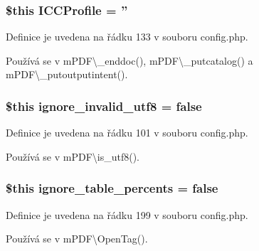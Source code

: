 \hypertarget{config_8php_af22f04b7300121fcbf6a8b3f52c759fb}{
\subsubsection[{I\-C\-C\-Profile}]{\setlength{\rightskip}{0pt plus 5cm}\$this I\-C\-C\-Profile = ''}}\label{config_8php_af22f04b7300121fcbf6a8b3f52c759fb}


Definice je uvedena na řádku 133 v souboru config.\-php.



Používá se v m\-P\-D\-F\textbackslash{}\-\_\-enddoc(), m\-P\-D\-F\textbackslash{}\-\_\-putcatalog() a m\-P\-D\-F\textbackslash{}\-\_\-putoutputintent().

\hypertarget{config_8php_a17ac742a18198cf70eed0b6b0c2a710a}{
\subsubsection[{ignore\-\_\-invalid\-\_\-utf8}]{\setlength{\rightskip}{0pt plus 5cm}\$this ignore\-\_\-invalid\-\_\-utf8 = {\bf false}}}\label{config_8php_a17ac742a18198cf70eed0b6b0c2a710a}


Definice je uvedena na řádku 101 v souboru config.\-php.



Používá se v m\-P\-D\-F\textbackslash{}is\-\_\-utf8().

\hypertarget{config_8php_a134c79434db6fc7c394867d9464828ec}{
\subsubsection[{ignore\-\_\-table\-\_\-percents}]{\setlength{\rightskip}{0pt plus 5cm}\$this ignore\-\_\-table\-\_\-percents = {\bf false}}}\label{config_8php_a134c79434db6fc7c394867d9464828ec}


Definice je uvedena na řádku 199 v souboru config.\-php.



Používá se v m\-P\-D\-F\textbackslash{}\-Open\-Tag().

